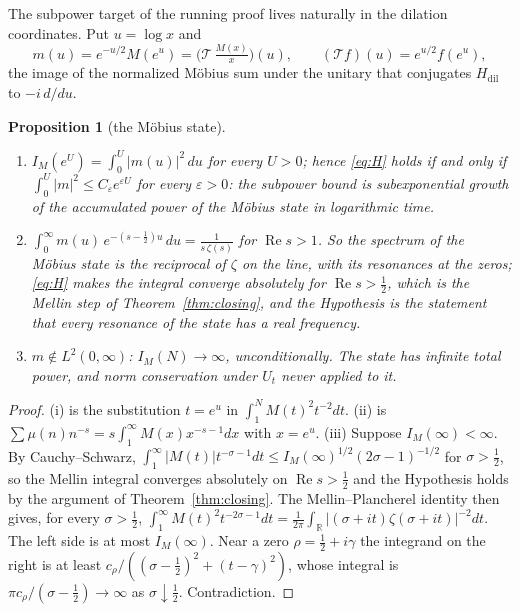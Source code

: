 \documentclass[11pt]{article}
\newtheorem{proposition}[theorem]{Proposition}
\theoremstyle{definition}
\theoremstyle{remark}
\newcommand{\R}{\mathbb R}
\newcommand{\Ree}{\operatorname{Re}}
\begin{document}
The subpower target of the running proof lives naturally in the dilation coordinates. Put $u=\log x$ and
\[
m(u)=e^{-u/2}M(e^u)=\big(\mathcal T\,\tfrac{M(x)}{x}\big)(u),\qquad (\mathcal Tf)(u)=e^{u/2}f(e^u),
\]
the image of the normalized Möbius sum under the unitary that conjugates $H_{\mathrm{dil}}$ to $-i\,d/du$.
\begin{proposition}[the Möbius state]\label{prop:mstate}
\begin{enumerate}
\item[(i)] $I_M(e^U)=\int_0^U|m(u)|^2\,du$ for every $U>0$; hence \eqref{eq:H} holds if and only if $\int_0^U|m|^2\le C_\varepsilon e^{\varepsilon U}$ for every $\varepsilon>0$: the subpower bound is subexponential growth of the accumulated power of the Möbius state in logarithmic time.
\item[(ii)] $\displaystyle\int_0^\infty m(u)\,e^{-(s-\frac12)u}\,du=\frac1{s\,\zeta(s)}$ for $\Ree s>1$. So the spectrum of the Möbius state is the reciprocal of $\zeta$ on the line, with its resonances at the zeros; \eqref{eq:H} makes the integral converge absolutely for $\Ree s>\tfrac12$, which is the Mellin step of Theorem~\ref{thm:closing}, and the Hypothesis is the statement that every resonance of the state has a real frequency.
\item[(iii)] $m\notin L^2(0,\infty)$: $I_M(N)\to\infty$, unconditionally. The state has infinite total power, and norm conservation under $U_t$ never applied to it.
\end{enumerate}
\end{proposition}
\begin{proof}
(i) is the substitution $t=e^u$ in $\int_1^NM(t)^2t^{-2}dt$. (ii) is $\sum\mu(n)n^{-s}=s\int_1^\infty M(x)x^{-s-1}dx$ with $x=e^u$. (iii) Suppose $I_M(\infty)<\infty$. By Cauchy--Schwarz, $\int_1^\infty|M(t)|t^{-\sigma-1}dt\le I_M(\infty)^{1/2}(2\sigma-1)^{-1/2}$ for $\sigma>\tfrac12$, so the Mellin integral converges absolutely on $\Ree s>\tfrac12$ and the Hypothesis holds by the argument of Theorem~\ref{thm:closing}. The Mellin--Plancherel identity then gives, for every $\sigma>\tfrac12$, $\int_1^\infty M(t)^2t^{-2\sigma-1}dt=\frac1{2\pi}\int_\R|(\sigma+it)\zeta(\sigma+it)|^{-2}dt$. The left side is at most $I_M(\infty)$. Near a zero $\rho=\tfrac12+i\gamma$ the integrand on the right is at least $c_\rho/((\sigma-\tfrac12)^2+(t-\gamma)^2)$, whose integral is $\pi c_\rho/(\sigma-\tfrac12)\to\infty$ as $\sigma\downarrow\tfrac12$. Contradiction.
\end{proof}
\end{document}
